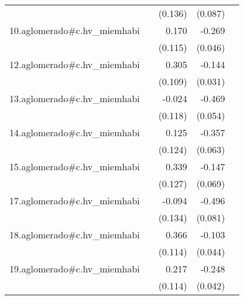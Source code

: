 {\begin{longtable}{l*{4}{D{.}{.}{-1}}}
            &                     &     (0.136)         &     (0.087)         &                     \\
\addlinespace
10.aglomerado#c.hv\_miemhabi&                     &       0.170         &      -0.269\sym{***}&                     \\
            &                     &     (0.115)         &     (0.046)         &                     \\
\addlinespace
12.aglomerado#c.hv\_miemhabi&                     &       0.305\sym{**} &      -0.144\sym{***}&                     \\
            &                     &     (0.109)         &     (0.031)         &                     \\
\addlinespace
13.aglomerado#c.hv\_miemhabi&                     &      -0.024         &      -0.469\sym{***}&                     \\
            &                     &     (0.118)         &     (0.054)         &                     \\
\addlinespace
14.aglomerado#c.hv\_miemhabi&                     &       0.125         &      -0.357\sym{***}&                     \\
            &                     &     (0.124)         &     (0.063)         &                     \\
\addlinespace
15.aglomerado#c.hv\_miemhabi&                     &       0.339\sym{**} &      -0.147\sym{*}  &                     \\
            &                     &     (0.127)         &     (0.069)         &                     \\
\addlinespace
17.aglomerado#c.hv\_miemhabi&                     &      -0.094         &      -0.496\sym{***}&                     \\
            &                     &     (0.134)         &     (0.081)         &                     \\
\addlinespace
18.aglomerado#c.hv\_miemhabi&                     &       0.366\sym{**} &      -0.103\sym{*}  &                     \\
            &                     &     (0.114)         &     (0.044)         &                     \\
\addlinespace
19.aglomerado#c.hv\_miemhabi&                     &       0.217         &      -0.248\sym{***}&                     \\
            &                     &     (0.114)         &     (0.042)         &                     \\

\end{longtable}}
